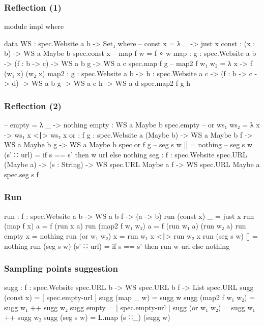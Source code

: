 \documentclass[aspectratio=169]{beamer}
\begin{document}
\begin{frame}
\frametitle{Reflection (1)}
\begin{code}
module impl where

  data WS : {spec.Website a b} -> Set₁ where
    -- const x = λ _ -> just x
    const : (x : b) -> WS {a} {Maybe b} {spec.const x}
    -- map f w = f ∘ w
    map : {g : spec.Website a b} ->
          (f : b -> c) -> WS {a} {b} {g} -> WS {a} {c} {spec.map f g}
    -- map2 f w₁ w₂ = λ x -> f (w₁ x) (w₂ x)
    map2 : {g : spec.Website a b} -> {h : spec.Website a c}
           -> (f : b -> c -> d)
           -> WS {a} {b} {g}
           -> WS {a} {c} {h}
           -> WS {a} {d} {spec.map2 f g h}
\end{code}
\end{frame}

\begin{frame}
\frametitle{Reflection (2)}
\begin{code}
    -- empty = λ _ -> nothing
    empty : WS {a} {Maybe b} {spec.empty}
    -- or ws₁ ws₂ = λ x -> ws₁ x <∣> ws₂ x
    or : {f g : spec.Website a (Maybe b)}
         -> WS {a} {Maybe b} {f}
         -> WS {a} {Maybe b} {g}
         -> WS {a} {Maybe b} {spec.or f g}
    -- seg s w [] = nothing
    -- seg s w (s' ∷ url) = if s == s' then w url else nothing
    seg : {f : spec.Website spec.URL (Maybe a)}
          -> (s : String)
          -> WS {spec.URL} {Maybe a} {f}
          -> WS {spec.URL} {Maybe a} {spec.seg s f}
\end{code}
\end{frame}

\begin{frame}
\frametitle{Run}
\begin{code}
  run : {f : spec.Website a b} -> WS {a} {b} {f} -> (a -> b)
  run (const x) _ = just x
  run (map f x) a = f (run x a)
  run (map2 f w₁ w₂) a = f (run w₁ a) (run w₂ a)
  run empty x = nothing
  run (or w₁ w₂) x = run w₁ x <∣> run w₂ x
  run (seg s w) [] = nothing
  run (seg s w) (s' ∷ url) = if s == s' then run w url else nothing
\end{code}
\end{frame}

\begin{frame}
\frametitle{Sampling points suggestion}
\begin{code}
  sugg : {f : spec.Website spec.URL b}
         -> WS {spec.URL} {b} {f}
         -> List spec.URL
  sugg (const x) = [ spec.empty-url ]
  sugg (map _ w) = sugg w
  sugg (map2 f w₁ w₂) = sugg w₁ ++ sugg w₂
  sugg empty = [ spec.empty-url ]
  sugg (or w₁ w₂) = sugg w₁ ++ sugg w₂
  sugg (seg s w) = L.map (s ∷_) (sugg w)
\end{code}
\end{frame}
\end{document}
